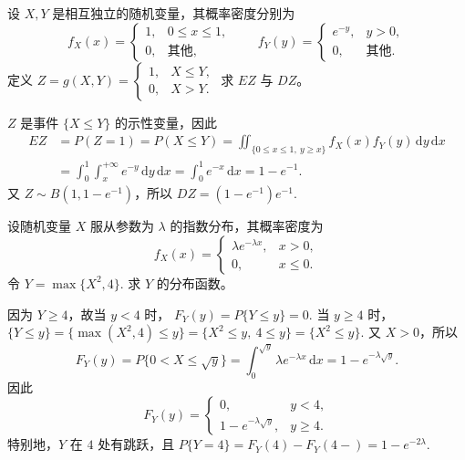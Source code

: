 \documentclass[lang=cn,11pt]{elegantbook}
\begin{document}
\begin{exercise}\label{exer:src-2010-0630-a-07-2credit}
设 \(X,Y\) 是相互独立的随机变量，其概率密度分别为
\[
f_X(x)=
\begin{cases}
1, & 0\le x\le1,\\
0, & \text{其他},
\end{cases}
\qquad
f_Y(y)=
\begin{cases}
e^{-y}, & y>0,\\
0, & \text{其他}.
\end{cases}
\]
定义
\(
Z=g(X,Y)=
\begin{cases}
1, & X\le Y,\\
0, & X>Y.
\end{cases}
\)
求 \(EZ\) 与 \(DZ\)。
\end{exercise}
\begin{solution}
\(Z\) 是事件 \(\{X\le Y\}\) 的示性变量，因此
\begin{align*}
EZ
&=P(Z=1)=P(X\le Y)=\iint_{\{0\le x\le1,\ y\ge x\}} f_X(x)f_Y(y)\,\mathrm{d}y\,\mathrm{d}x\\
&=\int_0^1\int_x^{+\infty} e^{-y}\,\mathrm{d}y\,\mathrm{d}x=\int_0^1 e^{-x}\,\mathrm{d}x=1-e^{-1}.
\end{align*}
又 \(Z\sim B(1,1-e^{-1})\)，所以
\(
DZ=(1-e^{-1})e^{-1}.
\)
\end{solution}

\begin{exercise}\label{exer:src-2012-a-07-2credit}
设随机变量 \(X\) 服从参数为 \(\lambda\) 的指数分布，其概率密度为
\[
f_X(x)=
\begin{cases}
\lambda e^{-\lambda x}, & x>0,\\
0, & x\le0.
\end{cases}
\]
令
\(
Y=\max\{X^2,4\}.
\)
求 \(Y\) 的分布函数。
\end{exercise}
\begin{solution}
因为 \(Y\ge4\)，故当 \(y<4\) 时，
\(
F_Y(y)=P\{Y\le y\}=0.
\)
当 \(y\ge4\) 时，
\(
\{Y\le y\}=\{\max(X^2,4)\le y\}=\{X^2\le y,\ 4\le y\}=\{X^2\le y\}.
\)
又 \(X>0\)，所以
\[
F_Y(y)=P\{0<X\le\sqrt y\}
=\int_0^{\sqrt y}\lambda e^{-\lambda x}\,\mathrm dx
=1-e^{-\lambda\sqrt y}.
\]
因此
\[
F_Y(y)=
\begin{cases}
0, & y<4,\\
1-e^{-\lambda\sqrt y}, & y\ge4.
\end{cases}
\]
特别地，\(Y\) 在 \(4\) 处有跳跃，且
\(
P\{Y=4\}=F_Y(4)-F_Y(4-)=1-e^{-2\lambda}.
\)
\end{solution}
\end{document}
